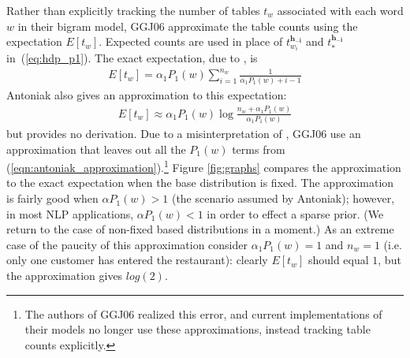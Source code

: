 \documentclass[11pt]{article}
\begin{document}
Rather than explicitly tracking the number of tables $t_w$ associated with each word $w$ in their bigram model,  GGJ06 approximate the table counts using the expectation $E[t_{w}]$. Expected counts are used in place of $t_{w_i}^{\mathbf{h_{-i}}}$  and $t_*^{\mathbf{h_{-i}}}$ in~(\ref{eq:hdp_p1}).  The exact expectation, due to , is
\begin{align}
E[t_w] = \alpha_1 P_1(w) \sum_{i=1}^{n_w} \frac{1}{\alpha_1 P_1(w) + i - 1}
\label{eqn:true_expected}
\end{align}
Antoniak also gives an approximation to this expectation:
\begin{align}
E[t_w] \approx \alpha_1 P_1(w) \log \frac{n_w + \alpha_1 P_1(w)}{\alpha_1 P_1(w)}
\label{eqn:antoniak_approximation}
\end{align}
but provides no derivation.  Due to a misinterpretation of  , GGJ06 use an approximation that leaves out all the $P_1(w)$ terms from (\ref{eqn:antoniak_approximation}).\footnote{The authors of GGJ06 realized this error, and current implementations of their models no longer use these approximations, instead tracking table counts explicitly.}  
Figure \ref{fig:graphs} compares the approximation to the exact expectation when the base distribution is fixed.  The approximation is fairly good when $\alpha P_1(w) > 1$ (the scenario assumed by Antoniak); however, in most NLP applications, $\alpha P_1(w) < 1$ in order to  effect a sparse prior.  (We return to the case of non-fixed based distributions in a moment.)
As an extreme case of the paucity of this approximation consider $\alpha_1 P_1(w) = 1$ and $n_w=1$ (i.e. only one customer has entered the restaurant): clearly $E[t_w]$ should equal $1$, but the approximation gives $log(2)$.
\end{document}
